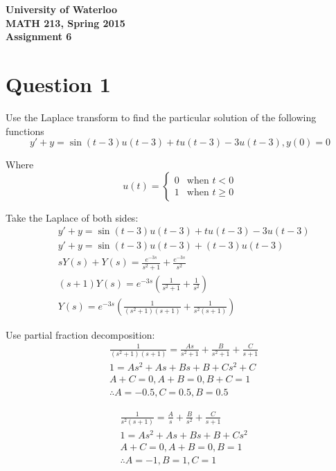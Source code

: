 \documentclass[12pt]{article}
\begin{document}
\begin{center}
{\Large\bf University of Waterloo}\\
\vspace{3mm}
{\Large\bf MATH 213, Spring 2015}\\
\vspace{2mm}
{\Large\bf Assignment 6}\\
\end{center}

\section*{Question 1}

Use the Laplace transform to find the particular solution of the following functions
$$y' + y = \sin(t - 3)u(t - 3) + tu(t - 3) - 3u(t - 3), y(0) = 0$$


\noindent Where
\[
 u(t) =
  \begin{cases}
    0 &\text{when } t < 0 \\
    1 &\text{when } t \ge 0
  \end{cases}
\]

Take the Laplace of both sides:
\begin{align*}
  &y' + y = \sin(t - 3)u(t - 3) + tu(t - 3) - 3u(t - 3)
  \\ &y' + y = \sin(t - 3)u(t - 3) + (t - 3)u(t - 3)
  \\ &sY(s) + Y(s) = \frac{e^{-3s}}{s^2 + 1} + \frac{e^{-3s}}{s^2}
  \\ &(s + 1)Y(s) = e^{-3s}(\frac{1}{s^2 + 1} + \frac{1}{s^2})
  \\ &Y(s) = e^{-3s}(\frac{1}{(s^2 + 1)(s + 1)} + \frac{1}{s^2(s + 1)})
\end{align*}

Use partial fraction decomposition:
\begin{align*}
  &\frac{1}{(s^2 + 1)(s + 1)} = \frac{As}{s^2 + 1} + \frac{B}{s^2 + 1} + \frac{C}{s + 1}
  \\&1 = As^2 + As + Bs + B + Cs^2 + C
  \\& A + C = 0, A + B = 0, B + C = 1
  \\& \therefore A = -0.5, C = 0.5, B = 0.5
\end{align*}

\begin{align*}
  &\frac{1}{s^2(s + 1)} = \frac{A}{s} + \frac{B}{s^2} + \frac{C}{s + 1}
  \\&1 = As^2 + As + Bs + B + Cs^2
  \\& A + C = 0, A + B = 0, B = 1
  \\& \therefore A = -1, B = 1, C = 1
\end{align*}
\end{document}

